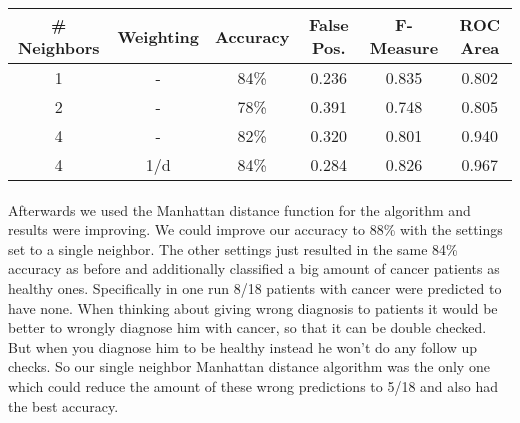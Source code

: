\documentclass{sig-alternate-05-2015}
\begin{document}
{\begin{center}
\begin{tabular}{ c | c | c | c | c | c }
\textbf{\# Neighbors} & \textbf{Weighting} & \textbf{Accuracy} & \textbf{False Pos.} & \textbf{F-Measure} & \textbf{ROC Area}\\
\hline
1 & - & 84\% & 0.236 & 0.835 &  0.802\\
2 & - & 78\% & 0.391 & 0.748 & 0.805\\
4 & - & 82\% & 0.320 & 0.801 & 0.940\\
4 & 1/d &  84\% & 0.284 & 0.826 & 0.967\\
\end{tabular}
\end{center}

\paragraph{}Afterwards we used the Manhattan distance function for the algorithm and results were improving. We could improve our accuracy to 88\% with the settings set to a single neighbor. The other settings just resulted in the same 84\% accuracy as before and additionally classified a big amount of cancer patients as healthy ones. Specifically in one run 8/18 patients with cancer were predicted to have none. When thinking about giving wrong diagnosis to patients it would be better to wrongly diagnose him with cancer, so that it can be double checked. But when you diagnose him to be healthy instead he won't do any follow up checks. So our single neighbor Manhattan distance algorithm was the only one which could reduce the amount of these wrong predictions to 5/18 and also had the best accuracy.


}
\end{document}

